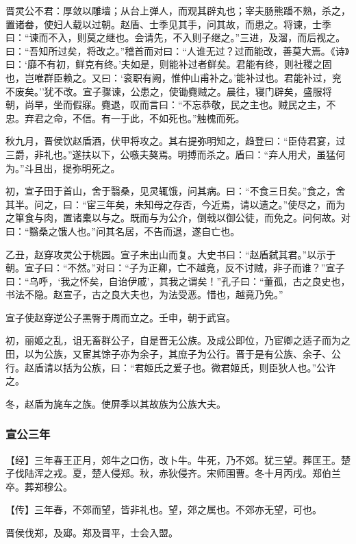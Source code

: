 \documentclass[]{article}
\begin{document}
晋灵公不君：厚敛以雕墙；从台上弹人，而观其辟丸也；宰夫肠熊蹯不熟，杀之，置诸畚，使妇人载以过朝。赵盾、士季见其手，问其故，而患之。将谏，士季曰：``谏而不入，则莫之继也。会请先，不入则子继之。''三进，及溜，而后视之。曰：``吾知所过矣，将改之。''稽首而对曰：``人谁无过？过而能改，善莫大焉。《诗》曰：`靡不有初，鲜克有终。'夫如是，则能补过者鲜矣。君能有终，则社稷之固也，岂唯群臣赖之。又曰：`衮职有阙，惟仲山甫补之。'能补过也。君能补过，兖不废矣。''犹不改。宣子骤谏，公患之，使锄麑贼之。晨往，寝门辟矣，盛服将朝，尚早，坐而假寐。麑退，叹而言曰：``不忘恭敬，民之主也。贼民之主，不忠。弃君之命，不信。有一于此，不如死也。''触槐而死。

秋九月，晋侯饮赵盾酒，伏甲将攻之。其右提弥明知之，趋登曰：``臣侍君宴，过三爵，非礼也。''遂扶以下，公嗾夫獒焉。明搏而杀之。盾曰：``弃人用犬，虽猛何为。''斗且出，提弥明死之。

初，宣子田于首山，舍于翳桑，见灵辄饿，问其病。曰：``不食三日矣。''食之，舍其半。问之，曰：``宦三年矣，未知母之存否，今近焉，请以遗之。''使尽之，而为之箪食与肉，置诸橐以与之。既而与为公介，倒戟以御公徒，而免之。问何故。对曰：``翳桑之饿人也。''问其名居，不告而退，遂自亡也。

乙丑，赵穿攻灵公于桃园。宣子未出山而复。大史书曰：``赵盾弑其君。''以示于朝。宣子曰：``不然。''对曰：``子为正卿，亡不越竟，反不讨贼，非子而谁？''宣子曰：``乌呼，`我之怀矣，自诒伊戚'，其我之谓矣！''孔子曰：``董孤，古之良史也，书法不隐。赵宣子，古之良大夫也，为法受恶。惜也，越竟乃免。''

宣子使赵穿逆公子黑臀于周而立之。壬申，朝于武宫。

初，丽姬之乱，诅无畜群公子，自是晋无公族。及成公即位，乃宦卿之适子而为之田，以为公族，又宦其馀子亦为余子，其庶子为公行。晋于是有公族、余子、公行。赵盾请以括为公族，曰：``君姬氏之爱子也。微君姬氏，则臣狄人也。''公许之。

冬，赵盾为旄车之族。使屏季以其故族为公族大夫。

\hypertarget{header-n1322}{%
\subsubsection{宣公三年}\label{header-n1322}}

【经】三年春王正月，郊牛之口伤，改卜牛。牛死，乃不郊。犹三望。葬匡王。楚子伐陆浑之戎。夏，楚人侵郑。秋，赤狄侵齐。宋师围曹。冬十月丙戌。郑伯兰卒。葬郑穆公。

【传】三年春，不郊而望，皆非礼也。望，郊之属也。不郊亦无望，可也。

晋侯伐郑，及郔。郑及晋平，士会入盟。
\end{document}
